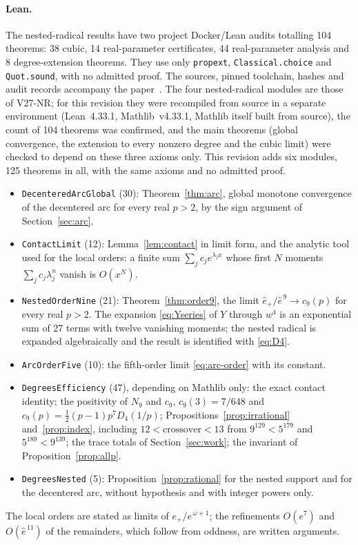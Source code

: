 \paragraph{Lean.}
The nested-radical results have two project Docker/Lean audits totalling 104 theorems: 38 cubic, 14
real-parameter certificates, 44 real-parameter analysis and 8 degree-extension theorems. They use only
\texttt{propext}, \texttt{Classical.choice} and \texttt{Quot.sound}, with no admitted proof. The
sources, pinned toolchain, hashes and audit records accompany the paper~\cite{lean4,mathlib,supplNR}.
The four nested-radical modules are those of V27-NR; for this revision they were recompiled from
source in a separate environment (Lean~4.33.1, Mathlib~v4.33.1, Mathlib itself built from source), the
count of 104 theorems was confirmed, and the main theorems (global convergence, the extension to every
nonzero degree and the cubic limit) were checked to depend on these three axioms only. This revision adds six modules, 125 theorems in all, with the same axioms and no admitted
proof.
\begin{itemize}
\item \texttt{DecenteredArcGlobal} (30): Theorem~\ref{thm:arc}, global monotone convergence of the
  decentered arc for every real $p>2$, by the sign argument of Section~\ref{sec:arc}.
\item \texttt{ContactLimit} (12): Lemma~\ref{lem:contact} in limit form, and the analytic tool used for
  the local orders: a finite sum $\sum_jc_je^{\lambda_jx}$ whose first $N$ moments
  $\sum_jc_j\lambda_j^{n}$ vanish is $O(x^{N})$.
\item \texttt{NestedOrderNine} (21): Theorem~\ref{thm:order9}, the limit
  $\hat e_+/\hat e^{\,9}\to c_9(p)$ for every real $p>2$. The expansion \eqref{eq:Yseries} of $Y$
  through $w^{4}$ is an exponential sum of 27 terms with twelve vanishing moments; the nested radical
  is expanded algebraically and the result is identified with \eqref{eq:D4}.
\item \texttt{ArcOrderFive} (10): the fifth-order limit \eqref{eq:arc-order} with its constant.
\item \texttt{DegreesEfficiency} (47), depending on Mathlib only: the exact contact identity; the
  positivity of $N_9$ and $c_9$, $c_9(3)=7/648$ and $c_9(p)=\tfrac12(p-1)p^{7}D_4(1/p)$;
  Propositions~\ref{prop:irrational} and~\ref{prop:index}, including $12<\text{crossover}<13$ from
  $9^{129}<5^{179}$ and $5^{189}<9^{139}$; the trace totals of Section~\ref{sec:work}; the invariant of
  Proposition~\ref{prop:allp}.
\item \texttt{DegreesNested} (5): Proposition~\ref{prop:rational} for the nested support and for the
  decentered arc, without hypothesis and with integer powers only.
\end{itemize}
The local orders are stated as limits of $e_+/e^{\,\omega+1}$; the refinements $O(e^{7})$ and
$O(\hat e^{\,11})$ of the remainders, which follow from oddness, are written arguments.

